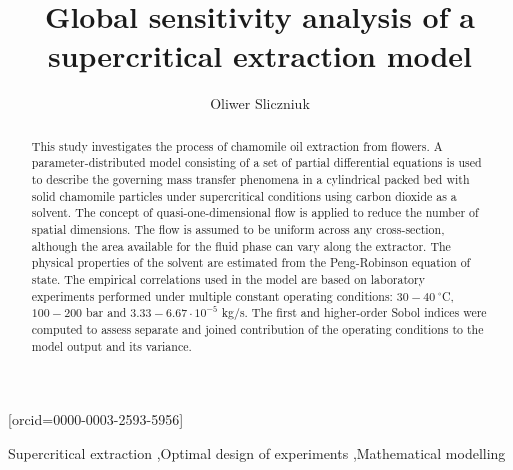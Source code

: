 \documentclass[a4paper,fleqn]{cas-dc}
\begin{document}
 

\title[mode=title]{Global sensitivity analysis of a supercritical extraction model}


\author[1]{Oliwer Sliczniuk}[orcid=0000-0003-2593-5956]
\cormark[1]



\address[1]{Aalto University, School of Chemical Engineering, Espoo, 02150, Finland}


\begin{abstract}
	This study investigates the process of chamomile oil extraction from flowers. A parameter-distributed model consisting of a set of partial differential equations is used to describe the governing mass transfer phenomena in a cylindrical packed bed with solid chamomile particles under supercritical conditions using carbon dioxide as a solvent. The concept of quasi-one-dimensional flow is applied to reduce the number of spatial dimensions. The flow is assumed to be uniform across any cross-section, although the area available for the fluid phase can vary along the extractor. The physical properties of the solvent are estimated from the Peng-Robinson equation of state. The empirical correlations used in the model are based on laboratory experiments performed under multiple constant operating conditions: $30 - 40~^\circ$C, $100 - 200$ bar and $3.33-6.67 \cdot 10^{-5}$ kg/s. The first and higher-order Sobol indices were computed to assess separate and joined contribution of the operating conditions to the model output and its variance.
	
\end{abstract}

\begin{keywords}
	Supercritical extraction \sep Optimal design of experiments \sep Mathematical modelling
\end{keywords}
\end{document}
